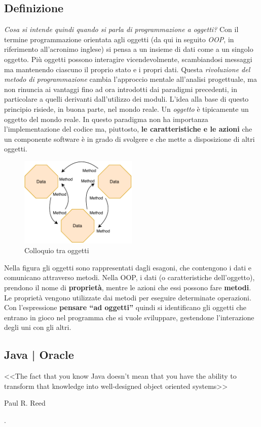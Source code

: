 \subsection{Definizione}
\textit{Cosa si intende quindi quando si parla di programmazione a oggetti?} Con il termine programmazione orientata agli oggetti (da qui in seguito \textit{OOP}, in riferimento all'acronimo inglese) si pensa a un insieme di dati come a un singolo oggetto. Più oggetti possono interagire vicendevolmente, scambiandosi messaggi ma mantenendo ciascuno il proprio stato e i propri dati. Questa \textit{rivoluzione del metodo di programmazione} cambia l'approccio mentale all'analisi progettuale, ma non rinuncia ai vantaggi fino ad ora introdotti dai paradigmi precedenti, in particolare a quelli derivanti dall'utilizzo dei moduli. L’idea alla base di questo principio risiede, in buona parte, nel mondo reale. Un \textit{oggetto} è tipicamente un oggetto del mondo reale. In questo paradigma non ha importanza l'implementazione del codice ma, piuttosto, \textbf{le caratteristiche e le azioni} che un componente software è in grado di svolgere e che mette a disposizione di altri oggetti.  
\begin{figure}[H]
    \centering
    \includegraphics[width=0.50\textwidth]{images/01_4_object_oriented_programming.pdf}
    \caption{Colloquio tra oggetti}
    \label{fig:objectoriented-programming}
\end{figure}
Nella figura gli oggetti sono rappresentati dagli esagoni, che contengono i dati e comunicano attraverso metodi. Nella OOP, i dati (o caratteristiche dell'oggetto), prendono il nome di \textbf{proprietà}, mentre le azioni che essi possono fare \textbf{metodi}. Le proprietà vengono utilizzate dai metodi per eseguire determinate operazioni. Con l'espressione \textbf{pensare “ad oggetti”} quindi si identificano gli oggetti che entrano in gioco nel programma che si vuole sviluppare, gestendone l’interazione degli uni con gli altri.

\subsection{Java | Oracle}
\setlength{\epigraphwidth}{.6\textwidth}
\epigraph{<<The fact that you know Java doesn’t mean that you have the ability to transform that knowledge into well-designed object oriented systems>>}{Paul R. Reed}.\cite{reed:developingapplications}

